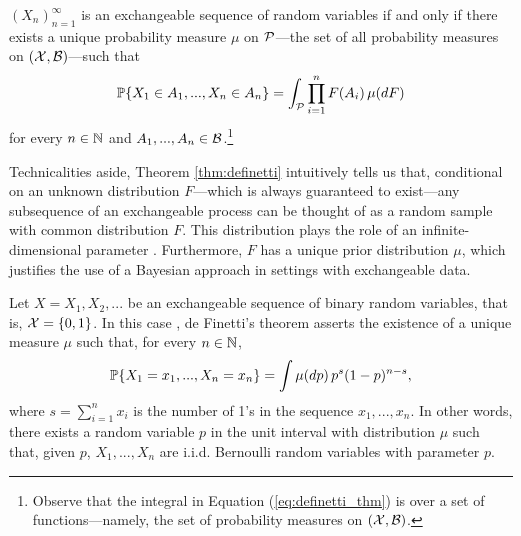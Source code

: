 \begin{theorem}[de Finneti] \label{thm:definetti}
	$(X_n)_{n=1}^{\infty}$ is an exchangeable sequence of random variables if and only if there exists a unique probability measure $\mu$ on $\mathcal{P}$---the set of all probability measures on $(\mathcal{X}, \mathcal{B})$---such that
	\begin{equation} \label{eq:definetti_thm}
		\mathbb{P} \{ X_1 \in A_1, ..., X_n \in A_n \} = \int_{\mathcal{P}}  \prod_{i=1}^n F(A_i) \, \mu(dF)
	\end{equation} 
	for every $n \in \mathbb{N}$ and $A_1, ..., A_n \in \mathcal{B}$.\footnote{Observe that the integral in Equation (\ref{eq:definetti_thm}) is over a set of functions---namely, the set of probability measures on $(\mathcal{X}, \mathcal{B})$.}
\end{theorem}




Technicalities aside, Theorem \ref{thm:definetti} intuitively tells us that, conditional on an unknown distribution $F$---which is always guaranteed to exist---any subsequence of an exchangeable process can be thought of as a random sample with common distribution $F$. This distribution plays the role of an infinite-dimensional parameter \cite[][Ch.~4.3]{BernardoSmith:1994:BayesianTheory}. Furthermore, $F$ has a unique prior distribution $\mu$, which justifies the use of a Bayesian approach in settings with exchangeable data.


\begin{mdframed}[backgroundcolor=mygray] 
	\begin{example} \label{ex:binary_definetti}
		Let $X = X_1, X_2, ...$ be an exchangeable sequence of binary random variables, that is, $\mathcal{X} = \{0, 1\}$. In this case \cite[see][p.111]{Diaconis:1988:PartialExchang}, de Finetti's theorem asserts the existence of a unique measure $\mu$ such that, for every $n \in \mathbb{N}$,
		\begin{equation*}
			\mathbb{P} \{ X_1 = x_1, ..., X_n = x_n \} = \int \mu(dp) \, p^s (1-p)^{n-s},
		\end{equation*}
		where $s = \sum_{i=1}^n x_i$ is the number of 1's in the sequence $x_1, ..., x_n$. In other words, there exists a random variable $p$ in the unit interval with distribution $\mu$ such that, given $p$, $X_1, ..., X_n$ are i.i.d. Bernoulli random variables with parameter $p$.
	\end{example}
\end{mdframed}








